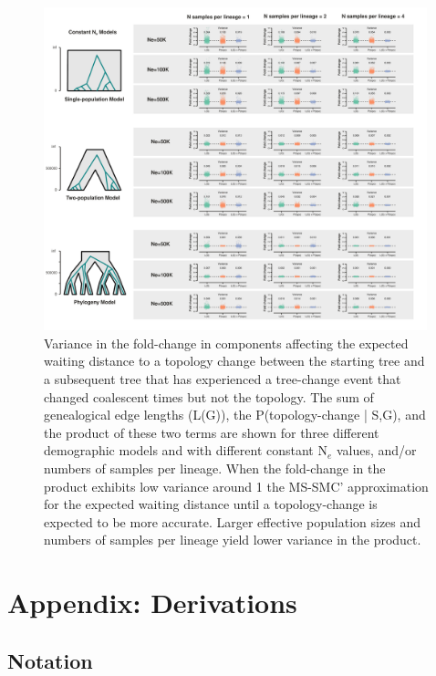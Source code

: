 \documentclass[11pt]{article}
\begin{document}
\begin{figure}[p]
	\centering
	\includegraphics[width=0.99\textwidth]{figures/FigSX-bias.pdf}
	\caption{
		Variance in the fold-change in components affecting the expected waiting 
		distance to a topology change between the starting tree and a subsequent
		tree that has experienced a tree-change event that changed coalescent times
		but not the topology. The sum of genealogical edge lengths (L(G)), the 
		P(topology-change | S,G), and the product of these two terms are shown for
		three different demographic models and with different constant N$_e$ values, 
		and/or numbers of samples per lineage.
		When the fold-change in the product exhibits low variance around 1 the 
		MS-SMC' approximation for the expected waiting distance until a topology-change 
		is expected to be more accurate. Larger effective population sizes and 
		numbers of samples per lineage yield lower variance in the product.
	}
     \label{fig:figS-bias-topo}
\end{figure}


\section{Appendix: Derivations}

\subsection{Notation}
\end{document}
